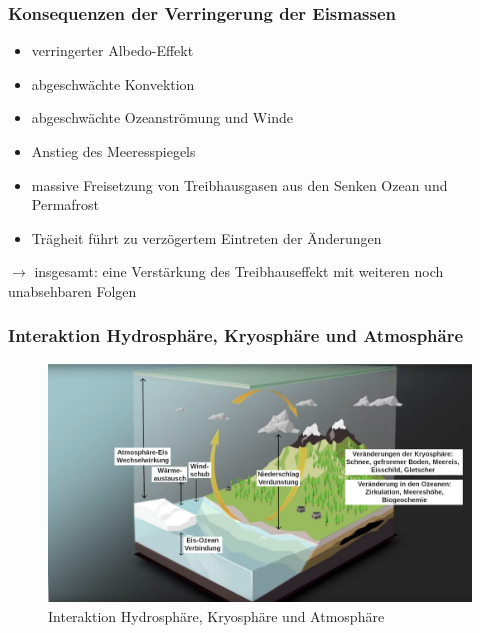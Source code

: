\begin{frame}
	\frametitle{Konsequenzen der Verringerung der Eismassen}
	\begin{itemize}
		\item verringerter Albedo-Effekt
		\item abgeschwächte Konvektion
		\item abgeschwächte Ozeanströmung und Winde
		\item Anstieg des Meeresspiegels
		\item massive Freisetzung von Treibhausgasen aus den Senken Ozean und Permafrost
		\item Trägheit führt zu verzögertem Eintreten der Änderungen
	\end{itemize}
	
	$\rightarrow$ insgesamt: eine Verstärkung des Treibhauseffekt mit weiteren noch unabsehbaren Folgen
	
\end{frame}

\begin{frame}
	\frametitle{Interaktion Hydrosphäre, Kryosphäre und Atmosphäre}
	\begin{figure}
		\centering
		\includegraphics{bilder/WMO_Cycles_factors_waterAndIce.png}
		\caption{Interaktion Hydrosphäre, Kryosphäre und Atmosphäre}
	\end{figure}

\end{frame}

